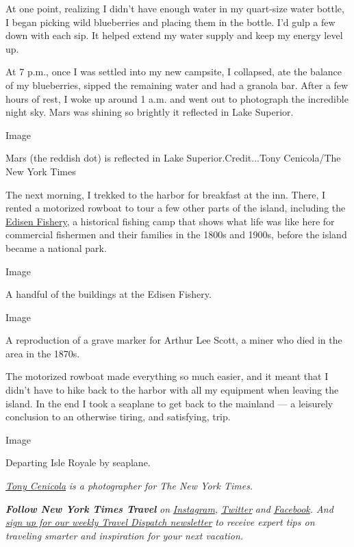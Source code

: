 At one point, realizing I didn't have enough water in my quart-size
water bottle, I began picking wild blueberries and placing them in the
bottle. I'd gulp a few down with each sip. It helped extend my water
supply and keep my energy level up.

At 7 p.m., once I was settled into my new campsite, I collapsed, ate the
balance of my blueberries, sipped the remaining water and had a granola
bar. After a few hours of rest, I woke up around 1 a.m. and went out to
photograph the incredible night sky. Mars was shining so brightly it
reflected in Lake Superior.

Image

Mars (the reddish dot) is reflected in Lake Superior.Credit...Tony
Cenicola/The New York Times

The next morning, I trekked to the harbor for breakfast at the inn.
There, I rented a motorized rowboat to tour a few other parts of the
island, including the
\href{http://iri.forest.mtu.edu/Historic_Fisheries/Pages/Rock_Tobin_Harbor/Edisen.htm}{Edisen
Fishery}, a historical fishing camp that shows what life was like here
for commercial fishermen and their families in the 1800s and 1900s,
before the island became a national park.

Image

A handful of the buildings at the Edisen Fishery.

Image

A reproduction of a grave marker for Arthur Lee Scott, a miner who died
in the area in the 1870s.

The motorized rowboat made everything so much easier, and it meant that
I didn't have to hike back to the harbor with all my equipment when
leaving the island. In the end I took a seaplane to get back to the
mainland --- a leisurely conclusion to an otherwise tiring, and
satisfying, trip.

Image

Departing Isle Royale by seaplane.

\href{https://www.nytimes.com/by/tony-cenicola}{\emph{Tony Cenicola}}
\emph{is a photographer for The New York Times.}

\emph{\textbf{Follow New York Times Travel}} \emph{on}
\href{https://www.instagram.com/nytimestravel/}{\emph{Instagram}}\emph{,}
\href{https://twitter.com/nytimestravel}{\emph{Twitter}} \emph{and}
\href{https://www.facebook.com/nytimestravel/}{\emph{Facebook}}\emph{.
And}
\href{https://www.nytimes.com/newsletters/traveldispatch}{\emph{sign up
for our weekly Travel Dispatch newsletter}} \emph{to receive expert tips
on traveling smarter and inspiration for your next vacation.}

